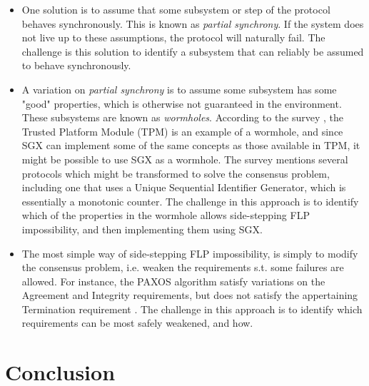 \documentclass[12pt]{article}
\begin{document}
		\begin{itemize}
			\item One solution is to assume that some subsystem or step of the protocol behaves synchronously. This is known as \textit{partial synchrony}. If the system does not live up to these assumptions, the protocol will naturally fail. The challenge is this solution to identify a subsystem that can reliably be assumed to behave synchronously. 
			\item A variation on \textit{partial synchrony} is to assume some subsystem has some "good" properties, which is otherwise not guaranteed in the environment. These subsystems are known as \textit{wormholes}. According to the survey \cite{consensus-survey}, the Trusted Platform Module (TPM) is an example of a wormhole, and since SGX can implement some of the same concepts as those available in TPM, it might be possible to use SGX as a wormhole. The survey mentions several protocols which might be transformed to solve the consensus problem, including one that uses a Unique Sequential Identifier Generator, which is essentially a monotonic counter. The challenge in this approach is to identify which of the properties in the wormhole allows side-stepping FLP impossibility, and then implementing them using SGX.
			\item The most simple way of side-stepping FLP impossibility, is simply to modify the consensus problem, i.e. weaken the requirements s.t. some failures are allowed. For instance, the PAXOS algorithm \cite{paxos} satisfy variations on the Agreement and Integrity requirements, but does not satisfy the appertaining Termination requirement \cite{fast-byz-cons}. The challenge in this approach is to identify which requirements can be most safely weakened, and how.
		\end{itemize}
		
	\section{Conclusion}
\end{document}
